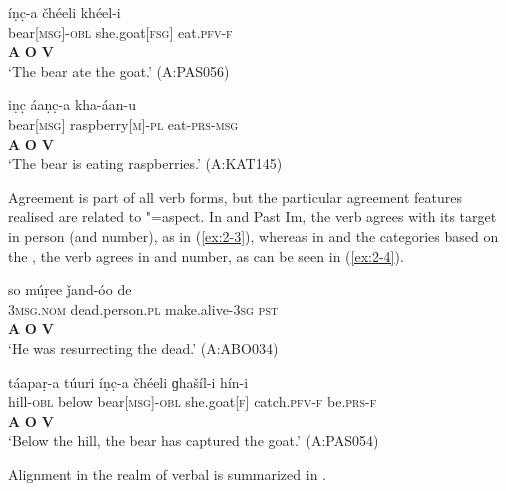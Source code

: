 \begin{exe}
\ex
\label{ex:2-1}
\glll íṇc̣-a čhéeli khéel-i \\
bear[\textsc{msg}]-\textsc{obl} she.goat[\textsc{fsg}] eat.\textsc{pfv-}\textsc{f}\\
\textbf{A} \textbf{O} \textbf{V}\\
\glt `The bear ate the goat.' (A:PAS056)
\end{exe}


\begin{exe}
\ex
\label{ex:2-2}
\glll iṇc̣ áaṇc̣-a kha-áan-u\\
bear[\textsc{msg}] raspberry[\textsc{m}]-\textsc{pl} eat-\textsc{prs-msg} \\
\textbf{A} \textbf{O} \textbf{V}\\
\glt `The bear is eating raspberries.' (A:KAT145)
\end{exe} 


Agreement is part of all  verb forms, but the particular agreement features realised are related to "=aspect. In  and Past Im, the verb agrees with its target in person (and number), as in (\ref{ex:2-3}), whereas in  and the categories based on the , the verb agrees in  and number, as can be seen in (\ref{ex:2-4}).

\begin{exe}
\ex
\label{ex:2-3}
\glll so múṛee ǰand-óo de \\
\textsc{3msg.nom} dead.person.\textsc{pl} make.alive-\textsc{3sg} \textsc{pst} \\
\textbf{A} \textbf{O} \textbf{V} \\
\glt `He was resurrecting the dead.' (A:ABO034)
\end{exe}

\begin{exe}
\ex
\label{ex:2-4}
\glll táapaṛ-a túuri íṇc̣-a čhéeli ɡhašíl-i hín-i \\ 
hill-\textsc{obl} below bear[\textsc{msg}]-\textsc{obl} she.goat[\textsc{f}] catch.\textsc{pfv-f} be.\textsc{prs-f} \\
{} {} \textbf{A} \textbf{O} \textbf{V} \\
\glt `Below the hill, the bear has captured the goat.' (A:PAS054)
\end{exe}


Alignment in the realm of verbal  is summarized in . 


